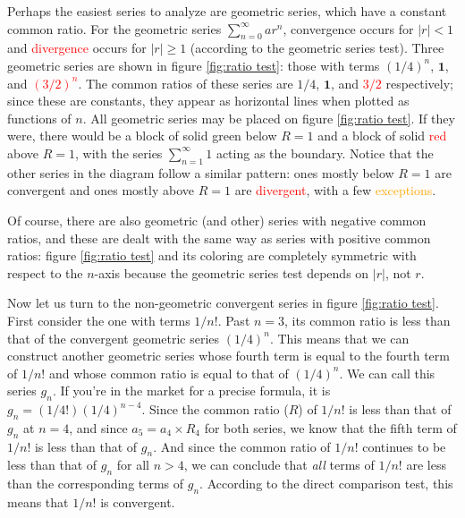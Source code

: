 \documentclass{myarticle}
\theoremstyle{nospace}
\newtheorem{old series theorem}{Theorem}
\newenvironment{series theorem}
{\begin{mdframed}\begin{old series theorem}}
    {\end{old series theorem}\end{mdframed}}
\begin{document}
Perhaps the easiest series to analyze are geometric series, which have
a constant common ratio. For the geometric series
$\sum_{n=0}^\infty ar^n$, \textcolor{nicegreen}{convergence} occurs
for $|r| < 1$ and \textcolor{red}{divergence} occurs for $|r| \geq 1$
(according to the geometric series test). Three geometric series are
shown in figure \ref{fig:ratio test}: those with terms
\textcolor{nicegreen}{$(1/4)^n$}, $\mathbf{1}$, and
\textcolor{red}{$(3/2)^n$}. The common ratios of these series are
\textcolor{nicegreen}{$1/4$}, $\mathbf{1}$, and \textcolor{red}{$3/2$}
respectively; since these are constants, they appear as horizontal
lines when plotted as functions of $n$. All geometric series may be
placed on figure \ref{fig:ratio test}. If they were, there would be a
block of solid \textcolor{nicegreen}{green} below $R = 1$ and a block
of solid \textcolor{red}{red} above $R = 1$, with the series
$\sum_{n=1}^\infty 1$ acting as the boundary. Notice that the other
series in the diagram follow a similar pattern: ones mostly below
$R = 1$ are \textcolor{nicegreen}{convergent} and ones mostly above
$R = 1$ are \textcolor{red}{divergent}, with a few
\textcolor{orange}{exceptions}.

Of course, there are also geometric (and other) series with negative
common ratios, and these are dealt with the same way as series with
positive common ratios: figure \ref{fig:ratio test} and its coloring
are completely symmetric with respect to the $n$-axis because the
geometric series test depends on $|r|$, not $r$.

Now let us turn to the non-geometric \textcolor{nicegreen}{convergent}
series in figure \ref{fig:ratio test}. First consider the one with
terms \textcolor{nicegreen}{$1/n!$}. Past $n = 3$, its common ratio is
less than that of the convergent geometric series
\textcolor{nicegreen}{$(1/4)^n$}. This means that we can construct
another geometric series whose fourth term is equal to the fourth term
of \textcolor{nicegreen}{$1/n!$} and whose common ratio is equal to
that of \textcolor{nicegreen}{$(1/4)^n$}. We can call this series
\textcolor{nicegreen}{$g_n$}. If you're in the market for a precise
formula, it is \textcolor{nicegreen}{$g_n = (1/4!)(1/4)^{n-4}$}. Since
the common ratio ($R$) of \textcolor{nicegreen}{$1/n!$} is less than
that of \textcolor{nicegreen}{$g_n$} at $n = 4$, and since
$a_5 = a_4 \times R_4$ for both series, we know that the fifth term of
\textcolor{nicegreen}{$1/n!$} is less than that of
\textcolor{nicegreen}{$g_n$}. And since the common ratio of
\textcolor{nicegreen}{$1/n!$} continues to be less than that of
\textcolor{nicegreen}{$g_n$} for all $n > 4$, we can conclude that
\emph{all} terms of \textcolor{nicegreen}{$1/n!$} are less than the
corresponding terms of \textcolor{nicegreen}{$g_n$}. According to the
direct comparison test, this means that \textcolor{nicegreen}{$1/n!$}
is convergent.
\end{document}
